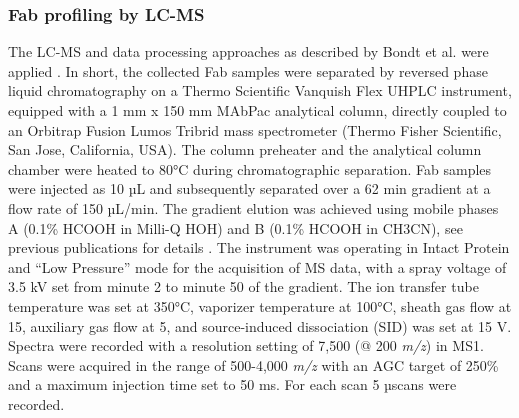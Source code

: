\subsubsection{Fab profiling by LC-MS}
The LC-MS and data processing approaches as described by Bondt et al. were applied \cite{bondt2021human, bondt2021direct}. In short, the collected Fab samples were separated by reversed phase liquid chromatography on a Thermo Scientific Vanquish Flex UHPLC instrument, equipped with a 1 mm x 150 mm MAbPac analytical column, directly coupled to an Orbitrap Fusion Lumos Tribrid mass spectrometer (Thermo Fisher Scientific, San Jose, California, USA). The column preheater and the analytical column chamber were heated to 80°C during chromatographic separation. Fab samples were injected as 10 µL and subsequently separated over a 62 min gradient at a flow rate of 150 µL/min. The gradient elution was achieved using mobile phases A (0.1\% HCOOH in Milli-Q HOH) and B (0.1\% HCOOH in CH3CN), see previous publications for details \cite{bondt2021human, bondt2021direct}. The instrument was operating in Intact Protein and “Low Pressure” mode for the acquisition of MS data, with a spray voltage of 3.5 kV set from minute 2 to minute 50 of the gradient. The ion transfer tube temperature was set at 350°C, vaporizer temperature at 100°C, sheath gas flow at 15, auxiliary gas flow at 5, and source-induced dissociation (SID) was set at 15 V. Spectra were recorded with a resolution setting of 7,500 (@ 200 \emph{m/z}) in MS1. Scans were acquired in the range of 500-4,000 \emph{m/z} with an AGC target of 250\% and a maximum injection time set to 50 ms. For each scan 5 µscans were recorded.

